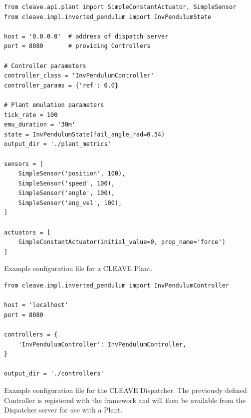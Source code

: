 \begin{listing}
    \begin{verbatim}
from cleave.api.plant import SimpleConstantActuator, SimpleSensor
from cleave.impl.inverted_pendulum import InvPendulumState

host = '0.0.0.0'  # address of dispatch server
port = 8080       # providing Controllers

# Controller parameters
controller_class = 'InvPendulumController'
controller_params = {'ref': 0.0}

# Plant emulation parameters 
tick_rate = 100
emu_duration = '30m'
state = InvPendulumState(fail_angle_rad=0.34)
output_dir = './plant_metrics'

sensors = [
    SimpleSensor('position', 100),
    SimpleSensor('speed', 100),
    SimpleSensor('angle', 100),
    SimpleSensor('ang_vel', 100),
]

actuators = [
    SimpleConstantActuator(initial_value=0, prop_name='force')
]
    \end{verbatim}
    \caption{
        Example configuration file for a CLEAVE Plant.
    }
    \label{lst:config:plant}
\end{listing}

\begin{listing}
    \begin{verbatim}
from cleave.impl.inverted_pendulum import InvPendulumController

host = 'localhost'
port = 8080

controllers = {
    'InvPendulumController': InvPendulumController,
}

output_dir = './controllers'
    \end{verbatim}
    \caption{
        Example configuration file for the CLEAVE Dispatcher.
        The previously defined Controller is registered with the framework and will then be available from the Dispatcher server for use with a Plant.
    }
    \label{lst:config:dispatcher}
\end{listing}